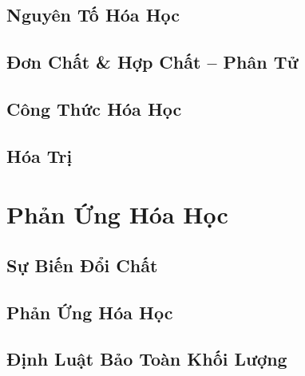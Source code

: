 \documentclass{article}
\numberwithin{equation}{section}
\begin{document}

\subsection{Nguyên Tố Hóa Học}


\subsection{Đơn Chất \& Hợp Chất -- Phân Tử}


\subsection{Công Thức Hóa Học}


\subsection{Hóa Trị}


\section{Phản Ứng Hóa Học}

\subsection{Sự Biến Đổi Chất}


\subsection{Phản Ứng Hóa Học}


\subsection{Định Luật Bảo Toàn Khối Lượng}
\end{document}
